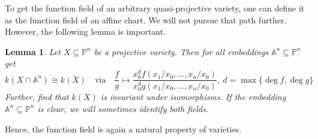 \documentclass{scrartcl}
\newtheorem{lemma}[prop]{Lemma}
\theoremstyle{definition}
\begin{document}
To get the function field of an arbitrary quasi-projective variety, one can define it as the function field of an affine chart.
We will not pursue that path further.
However, the following lemma is important.
\begin{lemma}
    Let $X \subseteq \mathbb{P}^n$ be a projective variety. Then for all embeddings $\mathbb{A}^n \subseteq \mathbb{P}^n$ get
    \begin{equation*}
        k(X \cap \mathbb{A}^n) \cong k(X) \quad \text{via} \quad \frac f g \mapsto \frac {x_0^d f({x_1} / {x_0}, ..., {x_n} / {x_0})} {x_0^d g({x_1} / {x_0}, ..., {x_n} / {x_0})}, \ d = \max \{\deg f, \deg g\}
    \end{equation*}
    Further, find that $k(X)$ is invariant under isomorphisms.
    If the embedding $\mathbb{A}^n \subseteq \mathbb{P}^n$ is clear, we will sometimes identify both fields.
\end{lemma}
Hence, the function field is again a natural property of varieties.
\end{document}
